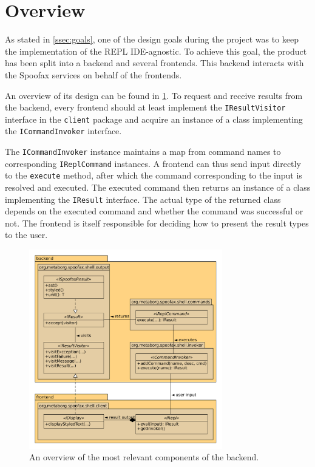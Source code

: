 \section{Overview}
\label{sec:overview}

As stated in \cref{ssec:goals}, one of the design goals during the project was
to keep the implementation of the REPL IDE-agnostic. To achieve this goal, the
product has been split into a backend and several frontends. This backend
interacts with the Spoofax services on behalf of the frontends.


An overview of its design can be found in \cref{fig:uml-overview}. To request
and receive results from the backend, every frontend should at least implement
the \texttt{IResultVisitor} interface in the \texttt{client} package and acquire
an instance of a class implementing the \texttt{ICommandInvoker} interface.

The \texttt{ICommandInvoker} instance maintains a map from command names to
corresponding \texttt{IReplCommand} instances. A frontend can thus send
input directly to the \texttt{execute} method, after which the command
corresponding to the input is resolved and executed. The executed command
then returns an instance of a class implementing the \texttt{IResult}
interface. The actual type of the returned class depends on the executed command
and whether the command was successful or not. The frontend is itself
responsible for deciding how to present the result types to the user.

\begin{figure}[h!]
  \centering
  \includegraphics[width=0.75\textwidth]{uml-overview}
  \caption{An overview of the most relevant components of the backend.}
  \label{fig:uml-overview}
\end{figure}
